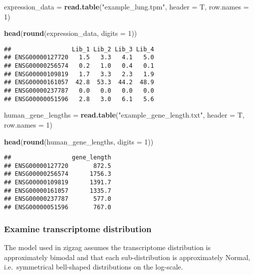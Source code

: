 \documentclass[]{article}
\newenvironment{Shaded}{\begin{snugshade}}{\end{snugshade}}
\newcommand{\KeywordTok}[1]{\textcolor[rgb]{0.13,0.29,0.53}{\textbf{{#1}}}}
\newcommand{\DataTypeTok}[1]{\textcolor[rgb]{0.13,0.29,0.53}{{#1}}}
\newcommand{\DecValTok}[1]{\textcolor[rgb]{0.00,0.00,0.81}{{#1}}}
\newcommand{\StringTok}[1]{\textcolor[rgb]{0.31,0.60,0.02}{{#1}}}
\newcommand{\NormalTok}[1]{{#1}}
\begin{document}
\begin{Shaded}
\begin{Highlighting}[]
\NormalTok{expression_data =}\StringTok{ }\KeywordTok{read.table}\NormalTok{(}\StringTok{"example_lung.tpm"}\NormalTok{, }\DataTypeTok{header =} \NormalTok{T, }\DataTypeTok{row.names =} \DecValTok{1}\NormalTok{)}

\KeywordTok{head}\NormalTok{(}\KeywordTok{round}\NormalTok{(expression_data, }\DataTypeTok{digits =} \DecValTok{1}\NormalTok{))}
\end{Highlighting}
\end{Shaded}

\begin{verbatim}
##                 Lib_1 Lib_2 Lib_3 Lib_4
## ENSG00000127720   1.5   3.3   4.1   5.0
## ENSG00000256574   0.2   1.0   0.4   0.1
## ENSG00000109819   1.7   3.3   2.3   1.9
## ENSG00000161057  42.8  53.3  44.2  48.9
## ENSG00000237787   0.0   0.0   0.0   0.0
## ENSG00000051596   2.8   3.0   6.1   5.6
\end{verbatim}

\begin{Shaded}
\begin{Highlighting}[]
\NormalTok{human_gene_lengths =}\StringTok{ }\KeywordTok{read.table}\NormalTok{(}\StringTok{"example_gene_length.txt"}\NormalTok{, }\DataTypeTok{header =} \NormalTok{T, }\DataTypeTok{row.names =} \DecValTok{1}\NormalTok{)}

\KeywordTok{head}\NormalTok{(}\KeywordTok{round}\NormalTok{(human_gene_lengths, }\DataTypeTok{digits =} \DecValTok{1}\NormalTok{))}
\end{Highlighting}
\end{Shaded}

\begin{verbatim}
##                 gene_length
## ENSG00000127720       872.5
## ENSG00000256574      1756.3
## ENSG00000109819      1391.7
## ENSG00000161057      1335.7
## ENSG00000237787       577.0
## ENSG00000051596       767.0
\end{verbatim}

\subsubsection{Examine transcriptome
distribution}\label{examine-transcriptome-distribution}

The model used in zigzag assumes the transcriptome distribution is
approximately bimodal and that each sub-distribution is approximately
Normal, i.e.~symmetrical bell-shaped distributions on the log-scale.
\end{document}
